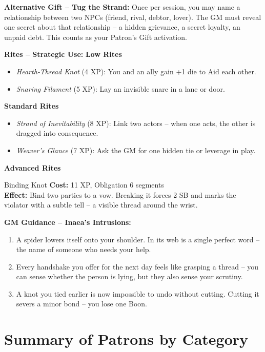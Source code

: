 \documentclass[10pt,a5paper]{book}
\begin{document}
\textbf{Alternative Gift -- Tug the Strand:} Once per session, you may name a relationship between two NPCs (friend, rival, debtor, lover). The GM must reveal one secret about that relationship -- a hidden grievance, a secret loyalty, an unpaid debt. This counts as your Patron's Gift activation.

\textbf{Rites -- Strategic Use:}
\textbf{Low Rites}
\begin{itemize}
    \item \textit{Hearth‑Thread Knot} (4 XP): You and an ally gain +1 die to Aid each other.
    \item \textit{Snaring Filament} (5 XP): Lay an invisible snare in a lane or door.
\end{itemize}
\textbf{Standard Rites}
\begin{itemize}
    \item \textit{Strand of Inevitability} (8 XP): Link two actors -- when one acts, the other is dragged into consequence.
    \item \textit{Weaver's Glance} (7 XP): Ask the GM for one hidden tie or leverage in play.
\end{itemize}
\textbf{Advanced Rites}
\begin{patronbox}{Binding Knot}
\textbf{Cost:} 11 XP, Obligation 6 segments \\
\textbf{Effect:} Bind two parties to a vow. Breaking it forces 2 SB and marks the violator with a subtle tell -- a visible thread around the wrist.
\end{patronbox}

\textbf{GM Guidance -- Inaea's Intrusions:}
\begin{enumerate}
    \item A spider lowers itself onto your shoulder. In its web is a single perfect word -- the name of someone who needs your help.
    \item Every handshake you offer for the next day feels like grasping a thread -- you can sense whether the person is lying, but they also sense your scrutiny.
    \item A knot you tied earlier is now impossible to undo without cutting. Cutting it severs a minor bond -- you lose one Boon.
\end{enumerate}

\clearpage

\section{Summary of Patrons by Category}
\end{document}
